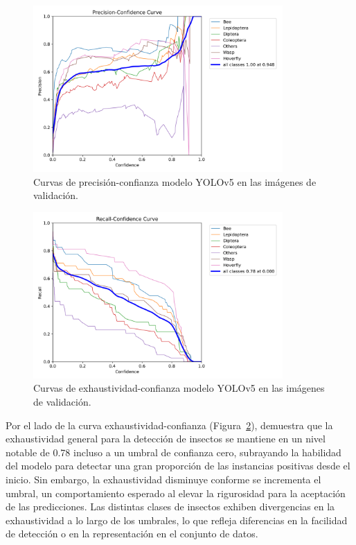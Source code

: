 \begin{figure}[H]
    \centering
    \includegraphics[width=0.85\textwidth]{Figuras/P_curve.png}
    \caption{Curvas de precisión-confianza modelo YOLOv5 en las imágenes de validación.}
    \label{fig:P_curve}
\end{figure}

\begin{figure}[H]
    \centering
    \includegraphics[width=0.85\textwidth]{Figuras/R_curve.png}
    \caption{Curvas de exhaustividad-confianza modelo YOLOv5 en las imágenes de validación.}
    \label{fig:R_curve}
\end{figure}

Por el lado de la curva exhaustividad-confianza (Figura~\ref{fig:R_curve}), demuestra que la exhaustividad general para la detección de insectos se mantiene en un nivel notable de 0.78 incluso a un umbral de confianza cero, subrayando la habilidad del modelo para detectar una gran proporción de las instancias positivas desde el inicio. Sin embargo, la exhaustividad disminuye conforme se incrementa el umbral, un comportamiento esperado al elevar la rigurosidad para la aceptación de las predicciones. Las distintas clases de insectos exhiben divergencias en la exhaustividad a lo largo de los umbrales, lo que refleja diferencias en la facilidad de detección o en la representación en el conjunto de datos.


